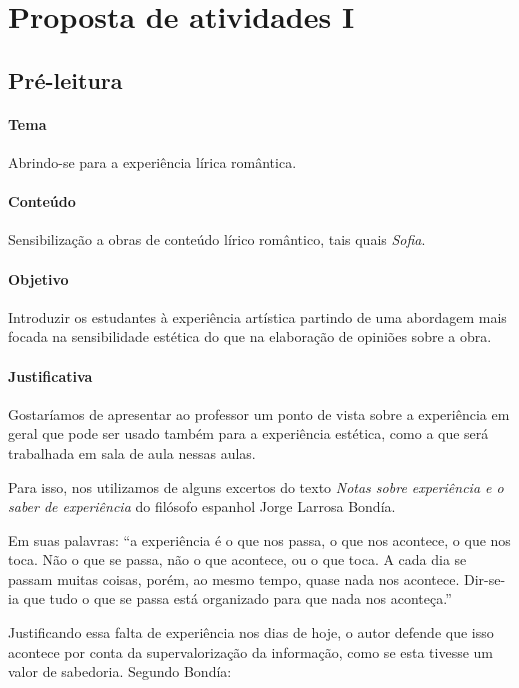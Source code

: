 \documentclass[12pt]{extarticle}
\begin{document}
\section{Proposta de atividades I}

\subsection{Pré-leitura}


\paragraph{Tema} Abrindo-se para a experiência lírica romântica.

\paragraph{Conteúdo} Sensibilização a obras de conteúdo lírico romântico,
tais quais \emph{Sofia}.

\paragraph{Objetivo} Introduzir os estudantes à experiência artística
partindo de uma abordagem mais focada na sensibilidade estética do que
na elaboração de opiniões sobre a obra. 

\paragraph{Justificativa} Gostaríamos de apresentar ao professor um
ponto de vista sobre a experiência em geral que pode ser usado
também para a experiência estética, como a que será trabalhada em 
sala de aula nessas aulas. 

Para isso, nos utilizamos de alguns excertos do texto \emph{Notas sobre
experiência e o saber de experiência} do filósofo espanhol Jorge
Larrosa Bondía. 

Em suas palavras: ``a experiência é o que nos passa, 
o que nos acontece, o que nos toca. Não o que se passa, não o que acontece, ou o que toca. A cada dia se 
passam muitas coisas, porém, ao mesmo tempo, quase nada nos acontece. 
Dir-se-ia que tudo o que se passa está organizado para que nada nos aconteça.''

Justificando essa falta de experiência nos dias de hoje, 
o autor defende que isso acontece por conta da supervalorização
da informação, como se esta tivesse um valor de sabedoria. Segundo Bondía: 
\end{document}
